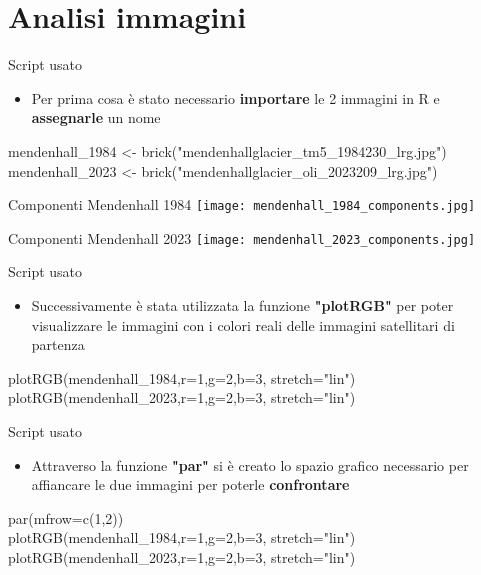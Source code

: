 \documentclass{beamer}
\begin{document}
\section{Analisi immagini}

\begin{frame}{Script usato}
\begin{itemize}
    \item Per prima cosa è stato necessario \textbf{importare} le 2 immagini in R e \textbf{assegnarle} un nome
\end{itemize}
\bigskip
\small mendenhall\_1984 <- brick("mendenhallglacier\_tm5\_1984230\_lrg.jpg")\\\small mendenhall\_2023 <- brick("mendenhallglacier\_oli\_2023209\_lrg.jpg")
\end{frame}

\begin{frame}{Componenti Mendenhall 1984}
    \texttt{[image: mendenhall\_1984\_components.jpg]}
    \centering
\end{frame}

\begin{frame}{Componenti Mendenhall 2023}
    \texttt{[image: mendenhall\_2023\_components.jpg]}
    \centering
\end{frame}

\begin{frame}{Script usato}
\begin{itemize}
    \item Successivamente è stata utilizzata la funzione \textbf{"plotRGB"} per poter visualizzare le immagini con i colori reali delle immagini satellitari di partenza
\end{itemize}
\bigskip
\small plotRGB(mendenhall\_1984,r=1,g=2,b=3, stretch="lin")\\
plotRGB(mendenhall\_2023,r=1,g=2,b=3, stretch="lin")
\end{frame}

 \begin{frame}{Script usato}
\begin{itemize}
    \item Attraverso la funzione \textbf{"par"} si è creato lo spazio grafico necessario per affiancare le due immagini per poterle \textbf{confrontare}
\end{itemize}
\bigskip
\small par(mfrow=c(1,2))\\
plotRGB(mendenhall\_1984,r=1,g=2,b=3, stretch="lin")\\
plotRGB(mendenhall\_2023,r=1,g=2,b=3, stretch="lin")
\end{frame}
\end{document}
